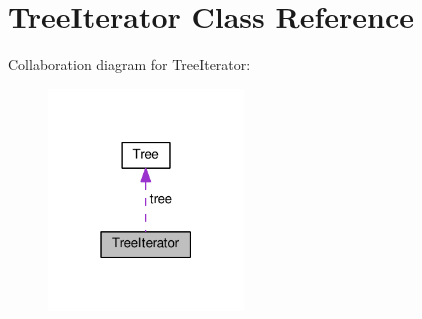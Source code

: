 \hypertarget{classTreeIterator}{}\section{Tree\+Iterator Class Reference}
\label{classTreeIterator}


Collaboration diagram for Tree\+Iterator\+:\nopagebreak
\begin{figure}[H]
\begin{center}
\leavevmode
\includegraphics[width=147pt]{classTreeIterator__coll__graph}
\end{center}
\end{figure}
